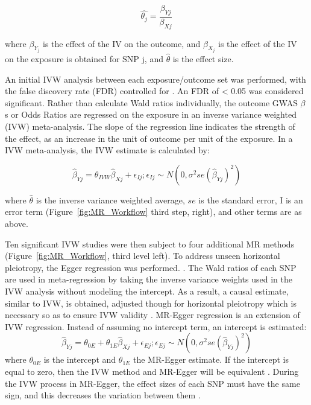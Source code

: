 \documentclass[journal,article,submit,moreauthors,pdftex]{Definitions/mdpi}
\begin{document}
\begin{equation}
\widehat{\theta_j}    = \frac{\beta_{Yj}}{\beta_{Xj}}
\end{equation}

where $\beta_Y_j$ is the effect of the IV on the outcome, and $\beta_X_j$ is the effect of the IV on the exposure is obtained for SNP j, and $\widehat{\theta}$ is the effect size.

An initial IVW analysis between each exposure/outcome set was performed, with the false discovery rate (FDR) controlled for \cite{benyamin_family-based_2009}. An FDR of < 0.05 was considered significant. Rather than calculate Wald ratios individually, the outcome GWAS $\beta$s or Odds Ratios are regressed on the exposure in an inverse variance weighted (IVW) meta-analysis. The slope of the regression line indicates the strength of the effect, as an increase in the unit of outcome per unit of the exposure\cite{burgess_interpreting_2017}. 
In a IVW meta-analysis, the  IVW estimate is calculated by:

\begin{equation}
\widehat{\beta}_{Yj} = \theta_{IVW}\widehat{\beta}_{Xj} + \epsilon_{Ij};      \epsilon_{Ij} \sim N(0,\sigma^2se(\widehat{\beta}_{Yj})^2)
\end{equation}

where $\widehat{\theta}$ is the inverse variance weighted average, $se$ is the standard error, I is an error term (Figure~\ref{fig:MR_Workflow} third step, right), and other terms are as above.

Ten significant IVW studies were then subject to four additional MR methods (Figure~\ref{fig:MR_Workflow}, third level left).  To address unseen horizontal pleiotropy, the Egger regression was performed. \cite{bowden_framework_2017,bowdenMendelianRandomizationInvalid2015b}. The Wald ratios of each SNP are used in meta-regression by taking the inverse variance weights used in the IVW analysis without modeling the intercept. As a result, a causal estimate, similar to IVW, is obtained, adjusted though for horizontal pleiotropy which is necessary so as to ensure IVW validity \cite{bowdenMendelianRandomizationInvalid2015b}.
MR-Egger regression is an extension of IVW regression. Instead of assuming no intercept term, an intercept is estimated:
\begin{equation}
\widehat{\beta}_{Yj} = \theta_{0E} + \theta_{1E}\widehat{\beta}_{Xj} + \epsilon_{Ej}; \epsilon_{Ej} \sim N(0,\sigma^2se(\widehat{\beta}_{Yj})^2)
\end{equation}
where $\theta_{0E}$ is the intercept and $\theta_{1E}$ the MR-Egger estimate.
If the intercept is equal to zero, then the IVW method and MR-Egger will be equivalent \cite{burgess_interpreting_2017}. During the IVW process in MR-Egger, the effect sizes of each SNP must have the same sign, and this decreases the variation between them \cite{bowdenMendelianRandomizationInvalid2015b}.
\end{document}
